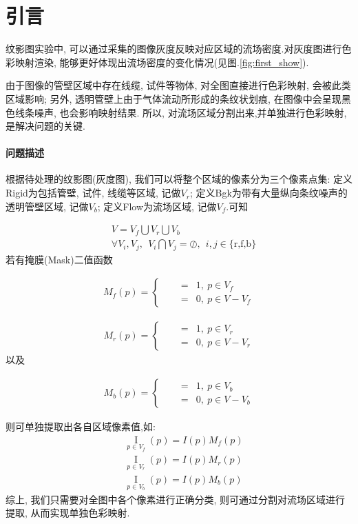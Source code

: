 \section{引言}

纹影图实验中, 可以通过采集的图像灰度反映对应区域的流场密度.对灰度图进行色彩映射渲染, 能够更好体现出流场密度的变化情况(见图.\ref{fig:first_show}).

由于图像的管壁区域中存在线缆, 试件等物体, 对全图直接进行色彩映射, 会被此类区域影响; 另外, 透明管壁上由于气体流动所形成的条纹状划痕, 在图像中会呈现黑色线条噪声, 也会影响映射结果.
所以, 对流场区域分割出来,并单独进行色彩映射, 是解决问题的关键.

\paragraph{问题描述}
根据待处理的纹影图(灰度图), 我们可以将整个区域的像素分为三个像素点集: 定义Rigid为包括管壁, 试件, 线缆等区域, 记做$V_{r}$; 定义Bgk为带有大量纵向条纹噪声的透明管壁区域, 记做$V_{b}$; 定义Flow为流场区域, 记做$V_{f}$.可知

\begin{eqnarray}
	\quad &V= V_{f} \bigcup V_{r} \bigcup V_{b}\\
	\nonumber
	\quad&\forall V_i, V_j, ~~ V_i\bigcap V_j = \oslash,~~ i,j \in \{\text{r,f,b}\}&
	\label{eq:v}
\end{eqnarray}
若有掩膜(Mask)二值函数

\begin{eqnarray}
	M_{f}(p) = \left\{
		\begin{aligned}
			\quad&=&1, ~ p\in V_{f}\\
			\nonumber
			\quad&=&0, ~p \in V - V_{f}
		\end{aligned}
	\right.
	\label{eq:Mf}
\end{eqnarray}


\begin{eqnarray}
	M_{r}(p) = \left\{
		\begin{aligned}
			\quad&=&1, ~ p\in V_{r}\\
			\nonumber
			\quad&=&0, ~p \in V - V_{r}
		\end{aligned}
	\right.
	\label{eq:Mr}
\end{eqnarray}
以及

\begin{eqnarray}
	M_{b}(p) = \left\{
		\begin{aligned}
			\quad&=&1, ~ p\in V_{b}\\
			\nonumber
			\quad&=&0, ~p \in V - V_{b}
		\end{aligned}
	\right.
	\label{eq:Mb}
\end{eqnarray}



则可单独提取出各自区域像素值,如:
\begin{eqnarray}
	\nonumber
	\quad \mathop{I}\limits_{p \in V_{f}}(p)= I(p) M_{f}(p)\\
	\nonumber
	\quad \mathop{I}\limits_{p \in V_{r}}(p)= I(p) M_{r}(p)\\
	\nonumber
	\quad \mathop{I}\limits_{p \in V_{b}}(p)= I(p) M_{b}(p)
\end{eqnarray}
综上, 我们只需要对全图中各个像素进行正确分类, 则可通过分割对流场区域进行提取, 从而实现单独色彩映射.


